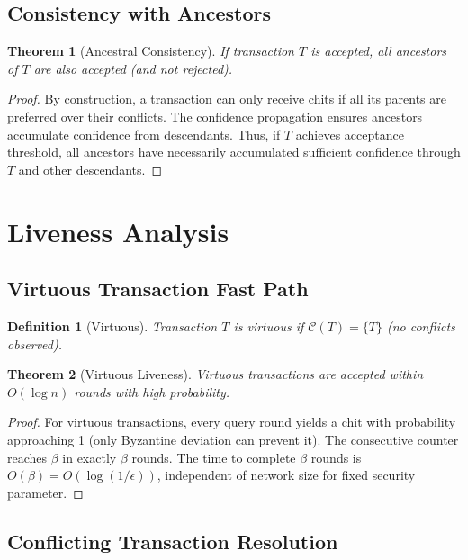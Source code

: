 \documentclass[11pt,a4paper]{article}
\newtheorem{theorem}{Theorem}
\newtheorem{definition}{Definition}
\begin{document}
\subsection{Consistency with Ancestors}

\begin{theorem}[Ancestral Consistency]
\label{thm:ancestral}
If transaction $T$ is accepted, all ancestors of $T$ are also accepted (and not rejected).
\end{theorem}

\begin{proof}
By construction, a transaction can only receive chits if all its parents are preferred over their conflicts. The confidence propagation ensures ancestors accumulate confidence from descendants. Thus, if $T$ achieves acceptance threshold, all ancestors have necessarily accumulated sufficient confidence through $T$ and other descendants.
\end{proof}

\section{Liveness Analysis}

\subsection{Virtuous Transaction Fast Path}

\begin{definition}[Virtuous]
Transaction $T$ is virtuous if $\mathcal{C}(T) = \{T\}$ (no conflicts observed).
\end{definition}

\begin{theorem}[Virtuous Liveness]
\label{thm:virtuous-live}
Virtuous transactions are accepted within $O(\log n)$ rounds with high probability.
\end{theorem}

\begin{proof}
For virtuous transactions, every query round yields a chit with probability approaching 1 (only Byzantine deviation can prevent it). The consecutive counter reaches $\beta$ in exactly $\beta$ rounds. The time to complete $\beta$ rounds is $O(\beta) = O(\log(1/\epsilon))$, independent of network size for fixed security parameter.
\end{proof}

\subsection{Conflicting Transaction Resolution}
\end{document}

